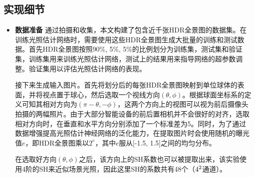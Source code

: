 \subsection{实现细节}
\begin{itemize}
    \item \textbf{数据准备} 通过拍摄和收集，本文构建了包含近千张HDR全景图的数据集。在训练光照估计网络时，需要使用这些HDR全景图生成大批量的训练和测试数据。首先HDR全景图按照90\%, 5\%, 5\%的比例划分为训练集，测试集和验证集，训练集用来训练光照估计网络，测试上的结果用来指导网络的超参数调整。验证集用以评估光照估计网络的表现。
    
    接下来生成输入图片。首先将划分后的每张HDR全景图映射到单位球体的表面，并将视点置于球心，然后选取一个视线方向$(\theta, \phi)$。根据球面坐标系的定义可知其相对方向为$(\pi-\theta, -\phi)$，这两个方向上的视图可以视为前后摄像头拍摄的两幅照片。由于大部分智能设备的前后置相机并不会很好的对齐，选取相对方向时，在垂直和水平方向分别添加了一个标准差为5。同时，为了通过数据增强提高光照估计神经网络的泛化能力，在提取图片时会使用随机的曝光值$e$，即HDR全景图乘以$2^e$，其中$e$服从[-1.5, 1.5]之间的均匀分布。

    在选取好方向$(\theta, \phi)$之后，该方向上的SH系数也可以被提取出来，该实验使用4阶的SH来近似场景光照，因此这里SH的系数共有48个（$4^2\time3$通道）。
    

\end{itemize}

